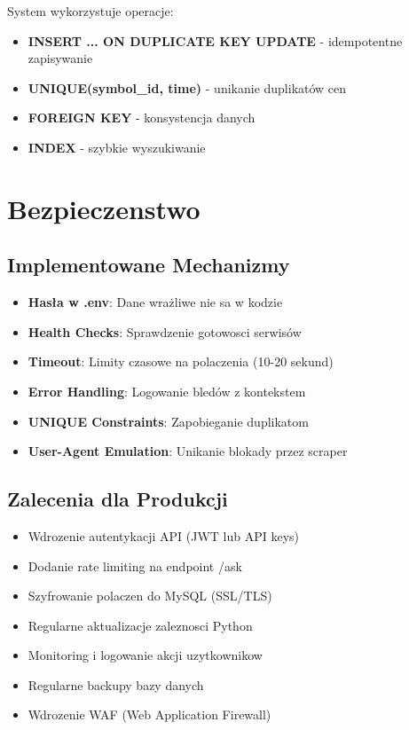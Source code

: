 \documentclass[11pt,a4paper]{article}
\begin{document}
System wykorzystuje operacje:
\begin{itemize}
    \item \textbf{INSERT ... ON DUPLICATE KEY UPDATE} - idempotentne zapisywanie
    \item \textbf{UNIQUE(symbol\_id, time)} - unikanie duplikatów cen
    \item \textbf{FOREIGN KEY} - konsystencja danych
    \item \textbf{INDEX} - szybkie wyszukiwanie
\end{itemize}

\section{Bezpieczenstwo}

\subsection{Implementowane Mechanizmy}

\begin{itemize}
    \item \textbf{Hasła w .env}: Dane wrażliwe nie sa w kodzie
    \item \textbf{Health Checks}: Sprawdzenie gotowosci serwisów
    \item \textbf{Timeout}: Limity czasowe na polaczenia (10-20 sekund)
    \item \textbf{Error Handling}: Logowanie bledów z kontekstem
    \item \textbf{UNIQUE Constraints}: Zapobieganie duplikatom
    \item \textbf{User-Agent Emulation}: Unikanie blokady przez scraper
\end{itemize}

\subsection{Zalecenia dla Produkcji}

\begin{itemize}
    \item Wdrozenie autentykacji API (JWT lub API keys)
    \item Dodanie rate limiting na endpoint /ask
    \item Szyfrowanie polaczen do MySQL (SSL/TLS)
    \item Regularne aktualizacje zaleznosci Python
    \item Monitoring i logowanie akcji uzytkownikow
    \item Regularne backupy bazy danych
    \item Wdrozenie WAF (Web Application Firewall)
\end{itemize}
\end{document}
